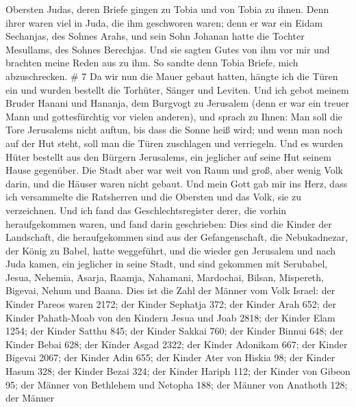 Obersten Judas, deren Briefe gingen zu Tobia und von Tobia zu ihnen.
 Denn ihrer waren viel in Juda, die ihm geschworen waren;
denn er war ein Eidam Sechanjas, des Sohnes Arahs, und sein Sohn Johanan
hatte die Tochter Mesullams, des Sohnes Berechjas.  Und sie
sagten Gutes von ihm vor mir und brachten meine Reden aus zu ihm. So
sandte denn Tobia Briefe, mich abzuschrecken. \# 7  Da wir
nun die Mauer gebaut hatten, hängte ich die Türen ein und wurden
bestellt die Torhüter, Sänger und Leviten.  Und ich gebot
meinem Bruder Hanani und Hananja, dem Burgvogt zu Jerusalem (denn er war
ein treuer Mann und gottesfürchtig vor vielen anderen),  und
sprach zu Ihnen: Man soll die Tore Jerusalems nicht auftun, bis dass die
Sonne heiß wird; und wenn man noch auf der Hut steht, soll man die Türen
zuschlagen und verriegeln. Und es wurden Hüter bestellt aus den Bürgern
Jerusalems, ein jeglicher auf seine Hut seinem Hause gegenüber.
 Die Stadt aber war weit von Raum und groß, aber wenig Volk
darin, und die Häuser waren nicht gebaut.  Und mein Gott gab
mir ins Herz, dass ich versammelte die Ratsherren und die Obersten und
das Volk, sie zu verzeichnen. Und ich fand das Geschlechtsregister
derer, die vorhin heraufgekommen waren, und fand darin geschrieben:
 Dies sind die Kinder der Landschaft, die heraufgekommen
sind aus der Gefangenschaft, die Nebukadnezar, der König zu Babel, hatte
weggeführt, und die wieder gen Jerusalem und nach Juda kamen, ein
jeglicher in seine Stadt,  und sind gekommen mit Serubabel,
Jesua, Nehemia, Asarja, Raamja, Nahamani, Mardochai, Bilsan, Mispereth,
Bigevai, Nehum und Baana. Dies ist die Zahl der Männer vom Volk Israel:
 der Kinder Pareos waren 2172;  der Kinder
Sephatja 372;  der Kinder Arah 652;  der
Kinder Pahath-Moab von den Kindern Jesua und Joab 2818; 
der Kinder Elam 1254;  der Kinder Satthu 845; 
der Kinder Sakkai 760;  der Kinder Binnui 648;
 der Kinder Bebai 628;  der Kinder Asgad 2322;
 der Kinder Adonikam 667;  der Kinder Bigevai
2067;  der Kinder Adin 655;  der Kinder Ater
von Hiskia 98;  der Kinder Hasum 328;  der
Kinder Bezai 324;  der Kinder Hariph 112;  der
Kinder von Gibeon 95;  der Männer von Bethlehem und Netopha
188;  der Männer von Anathoth 128;  der Männer
